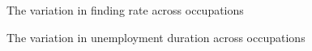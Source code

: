 \documentclass[12pt]{article}
\theoremstyle{definition}
\begin{document}
\begin{figure}[H]
    \noindent\caption{The variation in finding rate across occupations}
    \begin{center}
        \label{wiczerLongTermUnemploymentAttached2015_fig4}
    \end{center}
\end{figure}

\begin{figure}[H]
    \noindent\caption{The variation in unemployment duration across occupations}
    \begin{center}
        \label{wiczerLongTermUnemploymentAttached2015_fig5}
    \end{center}
\end{figure}
\end{document}
